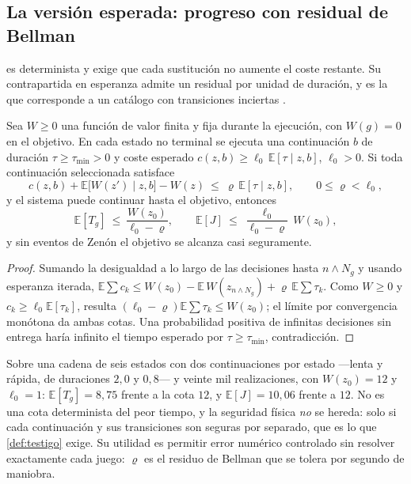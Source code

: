 \subsection{La versión esperada: progreso con residual de Bellman}

 es determinista y exige que cada sustitución no aumente el
coste restante. Su contrapartida en esperanza admite un residual por unidad de
duración, y es la que corresponde a un catálogo con transiciones inciertas
\cite{mayorga2026m1}.

\begin{teorema}
\label{th:bellman-residual}
Sea $W\ge0$ una función de valor finita y fija durante la ejecución, con
$W(g)=0$ en el objetivo. En cada estado no terminal se ejecuta una continuación
$b$ de duración $\tau\ge\tau_{\min}>0$ y coste esperado
$c(z,b)\ge\ell_0\,\mathbb E[\tau\mid z,b]$, $\ell_0>0$. Si toda continuación
seleccionada satisface
\[
  c(z,b)+\mathbb E\bigl[W(z')\mid z,b\bigr]-W(z)\ \le\ \varrho\,\mathbb E[\tau\mid z,b],
  \qquad 0\le\varrho<\ell_0,
\]
y el sistema puede continuar hasta el objetivo, entonces
\[
  \mathbb E[T_g]\ \le\ \frac{W(z_0)}{\ell_0-\varrho},
  \qquad
  \mathbb E[J]\ \le\ \frac{\ell_0}{\ell_0-\varrho}\,W(z_0),
\]
y sin eventos de Zenón el objetivo se alcanza casi seguramente.
\end{teorema}

\begin{proof}
Sumando la desigualdad a lo largo de las decisiones hasta $n\wedge N_g$ y usando
esperanza iterada, $\mathbb E\sum c_k\le W(z_0)-\mathbb E\,W(z_{n\wedge N_g})
+\varrho\,\mathbb E\sum\tau_k$. Como $W\ge0$ y $c_k\ge\ell_0\mathbb E[\tau_k]$,
resulta $(\ell_0-\varrho)\mathbb E\sum\tau_k\le W(z_0)$; el límite por
convergencia monótona da ambas cotas. Una probabilidad positiva de infinitas
decisiones sin entrega haría infinito el tiempo esperado por $\tau\ge\tau_{\min}$,
contradicción.
\end{proof}

\begin{observacion}
\label{obs:bellman-num}
Sobre una cadena de seis estados con dos continuaciones por estado —lenta y
rápida, de duraciones $2{,}0$ y $0{,}8$— y veinte mil realizaciones, con
$W(z_0)=12$ y $\ell_0=1$: $\mathbb E[T_g]=8{,}75$ frente a la cota $12$, y
$\mathbb E[J]=10{,}06$ frente a $12$. No es una cota determinista del peor
tiempo, y la seguridad física \emph{no} se hereda: solo si cada continuación y
sus transiciones son seguras por separado, que es lo que \cref{def:testigo}
exige. Su utilidad es permitir error numérico controlado sin resolver
exactamente cada juego: $\varrho$ es el residuo de Bellman que se tolera por
segundo de maniobra.
\end{observacion}

